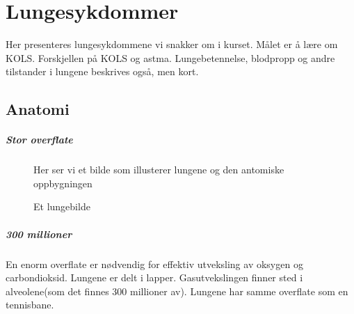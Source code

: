 \chapter{Lungesykdommer}
			Her presenteres lungesykdommene vi snakker om i kurset. Målet er å lære om KOLS. Forskjellen på KOLS og astma. Lungebetennelse, blodpropp og andre tilstander i lungene beskrives også, men kort.
		\section{Anatomi}
			\paragraph{Stor overflate\\}
				\begin{figure}[ht]
                      \centering
                      \caption{Et lungebilde}
                      {Her ser vi et bilde som illusterer lungene og den antomiske oppbygningen}%
                    \end{figure}
            \paragraph{300 millioner\\}
            	En enorm overflate er nødvendig for effektiv utveksling av oksygen og carbondioksid. Lungene er delt i lapper. Gasutvekslingen finner sted i alveolene(som det finnes 300 millioner av). Lungene har samme overflate som en tennisbane.
